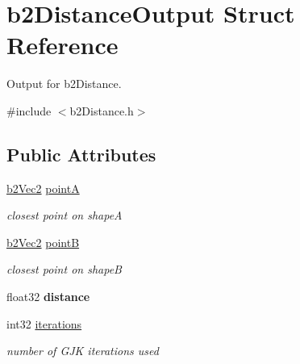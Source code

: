\hypertarget{structb2_distance_output}{}\section{b2\+Distance\+Output Struct Reference}
\label{structb2_distance_output}


Output for b2\+Distance.  




{\ttfamily \#include $<$b2\+Distance.\+h$>$}

\subsection*{Public Attributes}
\begin{DoxyCompactItemize}
\item 
\hyperlink{structb2_vec2}{b2\+Vec2} \hyperlink{structb2_distance_output_a7e0f1f44a64e596dc7d37570c69eefce}{pointA}\hypertarget{structb2_distance_output_a7e0f1f44a64e596dc7d37570c69eefce}{}\label{structb2_distance_output_a7e0f1f44a64e596dc7d37570c69eefce}

\begin{DoxyCompactList}\small\item\em closest point on shapeA \end{DoxyCompactList}\item 
\hyperlink{structb2_vec2}{b2\+Vec2} \hyperlink{structb2_distance_output_aa85beca17337a506cd4a924d0c6f92cc}{pointB}\hypertarget{structb2_distance_output_aa85beca17337a506cd4a924d0c6f92cc}{}\label{structb2_distance_output_aa85beca17337a506cd4a924d0c6f92cc}

\begin{DoxyCompactList}\small\item\em closest point on shapeB \end{DoxyCompactList}\item 
float32 {\bfseries distance}\hypertarget{structb2_distance_output_ae67f480ff37d4ab732e6366f485c7f55}{}\label{structb2_distance_output_ae67f480ff37d4ab732e6366f485c7f55}

\item 
int32 \hyperlink{structb2_distance_output_ae2d4c84dd3d05ea4f4d20c91099ec8d5}{iterations}\hypertarget{structb2_distance_output_ae2d4c84dd3d05ea4f4d20c91099ec8d5}{}\label{structb2_distance_output_ae2d4c84dd3d05ea4f4d20c91099ec8d5}

\begin{DoxyCompactList}\small\item\em number of G\+JK iterations used \end{DoxyCompactList}\end{DoxyCompactItemize}


